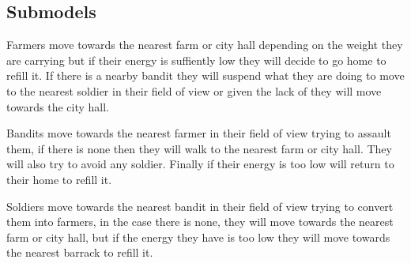 \documentclass{article}
\begin{document}
\subsection{Submodels}
Farmers move towards the nearest farm or city hall depending on the weight
they are carrying but if their energy is suffiently low they will decide to go home
to refill it. If there is a nearby bandit they will suspend what they are doing
to move to the nearest soldier in their field of view or given the lack of they
will move towards the city hall.

Bandits move towards the nearest farmer in their field of view trying to assault them,
if there is none then they will walk to the nearest farm or city hall. They will also
try to avoid any soldier. Finally if their energy is too low will return to their home
to refill it.

Soldiers move towards the nearest bandit in their field of view trying to convert
them into farmers, in the case there is none, they will move towards the nearest
farm or city hall, but if the energy they have is too low they will move towards
the nearest barrack to refill it.
\end{document}
